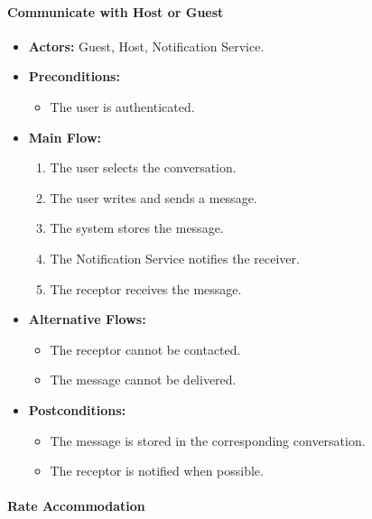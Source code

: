 \paragraph{Communicate with Host or Guest}

\begin{itemize}
    \item \textbf{Actors:} Guest, Host, Notification Service.
    
    \item \textbf{Preconditions:}
    \begin{itemize}
        \item The user is authenticated.
    \end{itemize}
    
    \item \textbf{Main Flow:}
    \begin{enumerate}
        \item The user selects the conversation.
        \item The user writes and sends a message.
        \item The system stores the message.
        \item The Notification Service notifies the receiver.
        \item The receptor receives the message.
    \end{enumerate}
    
    \item \textbf{Alternative Flows:}
    \begin{itemize}
        \item The receptor cannot be contacted.
        \item The message cannot be delivered.
    \end{itemize}
    
    \item \textbf{Postconditions:}
    \begin{itemize}
        \item The message is stored in the corresponding conversation.
        \item The receptor is notified when possible.
    \end{itemize}
\end{itemize}


\paragraph{Rate Accommodation}


